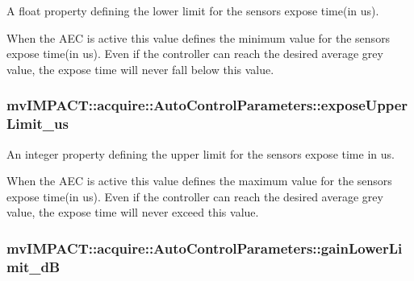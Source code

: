 A float property defining the lower limit for the sensors expose time(in us). 

When the A\+E\+C is active this value defines the minimum value for the sensors expose time(in us). Even if the controller can reach the desired average grey value, the expose time will never fall below this value. \hypertarget{classmv_i_m_p_a_c_t_1_1acquire_1_1_auto_control_parameters_a31bdff657d33b72b9da836a2cdd61fea}{
\subsubsection[{expose\+Upper\+Limit\+\_\+us}]{ mv\+I\+M\+P\+A\+C\+T\+::acquire\+::\+Auto\+Control\+Parameters\+::expose\+Upper\+Limit\+\_\+us}}\label{classmv_i_m_p_a_c_t_1_1acquire_1_1_auto_control_parameters_a31bdff657d33b72b9da836a2cdd61fea}


An integer property defining the upper limit for the sensors expose time in us. 

When the A\+E\+C is active this value defines the maximum value for the sensors expose time(in us). Even if the controller can reach the desired average grey value, the expose time will never exceed this value. \hypertarget{classmv_i_m_p_a_c_t_1_1acquire_1_1_auto_control_parameters_ad2c4a40a7f4898a6ffda900066e1dd7b}{
\subsubsection[{gain\+Lower\+Limit\+\_\+d\+B}]{ mv\+I\+M\+P\+A\+C\+T\+::acquire\+::\+Auto\+Control\+Parameters\+::gain\+Lower\+Limit\+\_\+d\+B}}\label{classmv_i_m_p_a_c_t_1_1acquire_1_1_auto_control_parameters_ad2c4a40a7f4898a6ffda900066e1dd7b}


